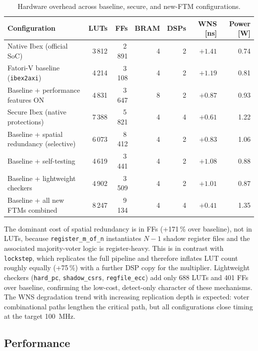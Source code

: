 \begin{table}[H]
\centering
\caption{Hardware overhead across baseline, secure, and new-\ac{FTM} configurations.}
\label{tab:cost_results}
\footnotesize
\begin{tabularx}{\textwidth}{lrrrrrr}
\toprule
Configuration & LUTs & FFs & BRAM & DSPs
  & WNS [ns] & Power [W] \\
\midrule
Native Ibex (official SoC)               & 3\,812 & 2\,891 & 4 & 2 & $+1.41$ & 0.74 \\
\ac{Fatori-V} baseline (\texttt{ibex2axi}) & 4\,214 & 3\,108 & 4 & 2 & $+1.19$ & 0.81 \\
Baseline + performance features ON       & 4\,831 & 3\,647 & 8 & 2 & $+0.87$ & 0.93 \\
Secure Ibex (native protections)         & 7\,388 & 5\,821 & 4 & 4 & $+0.61$ & 1.22 \\
Baseline + spatial redundancy (selective)& 6\,073 & 8\,412 & 4 & 2 & $+0.83$ & 1.06 \\
Baseline + self-testing                  & 4\,619 & 3\,441 & 4 & 2 & $+1.08$ & 0.88 \\
Baseline + lightweight checkers          & 4\,902 & 3\,509 & 4 & 2 & $+1.01$ & 0.87 \\
Baseline + all new \acp{FTM} combined    & 8\,247 & 9\,134 & 4 & 4 & $+0.41$ & 1.35 \\
\bottomrule
\end{tabularx}
\end{table}

The dominant cost of spatial redundancy is in FFs (+171\,\% over baseline), not in LUTs,
because \texttt{register\_m\_of\_n} instantiates $N-1$ shadow register files and the associated
majority-voter logic is register-heavy. This is in contrast with \texttt{lockstep}, which
replicates the full pipeline and therefore inflates LUT count roughly equally (+75\,\%) with a
further DSP copy for the multiplier. Lightweight checkers (\texttt{hard\_pc}, \texttt{shadow\_csrs},
\texttt{regfile\_ecc}) add only 688 LUTs and 401 FFs over baseline, confirming the low-cost,
detect-only character of these mechanisms. The WNS degradation trend with increasing replication
depth is expected: voter combinational paths lengthen the critical path, but all configurations
close timing at the target 100~MHz.

\subsection{Performance}
\label{chap9:perf_results}

